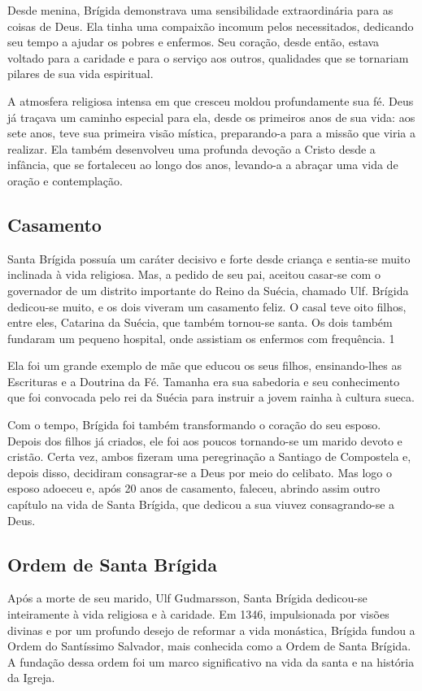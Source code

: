 \documentclass[a4paper,12pt]{extarticle} \usepackage[utf8]{inputenc}
\begin{document}
Desde menina, Brígida demonstrava uma sensibilidade extraordinária para as coisas de Deus. Ela tinha uma compaixão incomum pelos necessitados, dedicando seu tempo a ajudar os pobres e enfermos. Seu coração, desde então, estava voltado para a caridade e para o serviço aos outros, qualidades que se tornariam pilares de sua vida espiritual.

A atmosfera religiosa intensa em que cresceu moldou profundamente sua fé. Deus já traçava um caminho especial para ela, desde os primeiros anos de sua vida: aos sete anos, teve sua primeira visão mística, preparando-a para a missão que viria a realizar. Ela também desenvolveu uma profunda devoção a Cristo desde a infância, que se fortaleceu ao longo dos anos, levando-a a abraçar uma vida de oração e contemplação.

\subsection{Casamento}

Santa Brígida possuía um caráter decisivo e forte desde criança e sentia-se muito inclinada à vida religiosa. Mas, a pedido de seu pai, aceitou casar-se com o governador de um distrito importante do Reino da Suécia, chamado Ulf. Brígida dedicou-se muito, e os dois viveram um casamento feliz. O casal teve oito filhos, entre eles, Catarina da Suécia, que também tornou-se santa. Os dois também fundaram um pequeno hospital, onde assistiam os enfermos com frequência. 1

Ela foi um grande exemplo de mãe que educou os seus filhos, ensinando-lhes as Escrituras e a Doutrina da Fé. Tamanha era sua sabedoria e seu conhecimento que foi convocada pelo rei da Suécia para instruir a jovem rainha à cultura sueca. 

Com o tempo, Brígida foi também transformando o coração do seu esposo. Depois dos filhos já criados, ele foi aos poucos tornando-se um marido devoto e cristão. Certa vez, ambos fizeram uma peregrinação a Santiago de Compostela e, depois disso, decidiram consagrar-se a Deus por meio do celibato. Mas logo o esposo adoeceu e, após 20 anos de casamento, faleceu, abrindo assim outro capítulo na vida de Santa Brígida, que dedicou a sua viuvez consagrando-se a Deus.

\subsection{Ordem de Santa Brígida}

Após a morte de seu marido, Ulf Gudmarsson, Santa Brígida dedicou-se inteiramente à vida religiosa e à caridade. Em 1346, impulsionada por visões divinas e por um profundo desejo de reformar a vida monástica, Brígida fundou a Ordem do Santíssimo Salvador, mais conhecida como a Ordem de Santa Brígida. A fundação dessa ordem foi um marco significativo na vida da santa e na história da Igreja.
\end{document}
